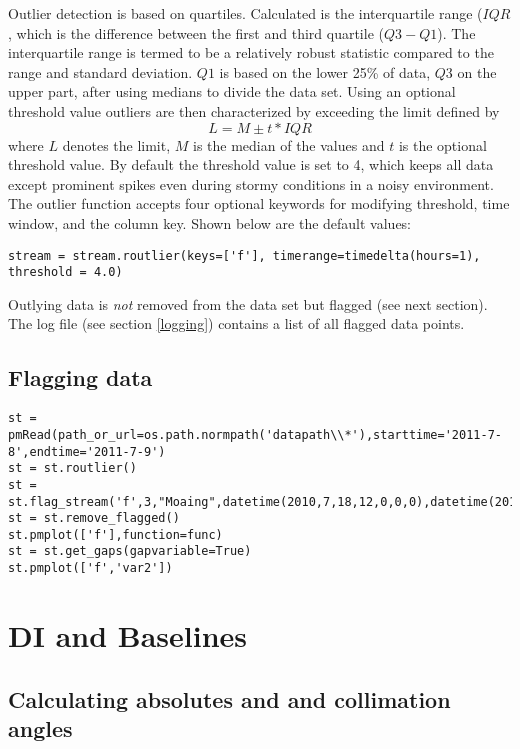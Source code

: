 Outlier detection is based on quartiles. Calculated is the interquartile range ($IQR$, which is the difference between the first and third quartile ($Q3 - Q1$). The interquartile range is termed to be a relatively robust statistic compared to the range and standard deviation. $Q1$ is based on the lower 25\% of data, $Q3$ on the upper part, after using medians to divide the data set. Using an optional threshold value outliers are then characterized by exceeding the limit defined by
\begin{equation}\label{outlier}
    L = M \pm t*IQR
\end{equation}
where $L$ denotes the limit, $M$ is the median of the values and $t$ is the optional threshold value. By default the threshold value is set to 4, which keeps all data except prominent spikes even during stormy conditions in a noisy environment. The outlier function accepts four optional keywords for modifying threshold, time window, and the column key. Shown below are the default values:
\begin{verbatim}
stream = stream.routlier(keys=['f'], timerange=timedelta(hours=1), threshold = 4.0)
\end{verbatim}
Outlying data is \emph{not} removed from the data set but flagged (see next section). The log file (see section \ref{logging}) contains a list of all flagged data points.

\subsection{Flagging data}\label{flagging}

\begin{verbatim}
st = pmRead(path_or_url=os.path.normpath('datapath\\*'),starttime='2011-7-8',endtime='2011-7-9')
st = st.routlier()
st = st.flag_stream('f',3,"Moaing",datetime(2010,7,18,12,0,0,0),datetime(2010,7,18,13,0,0,0))
st = st.remove_flagged()
st.pmplot(['f'],function=func)
st = st.get_gaps(gapvariable=True)
st.pmplot(['f','var2'])
\end{verbatim}


\section{DI and Baselines}

\subsection{Calculating absolutes and and collimation angles}

